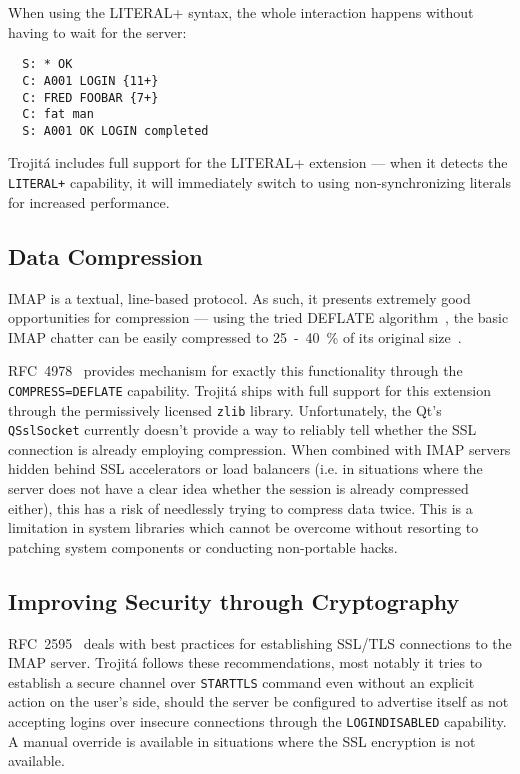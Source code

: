 \documentclass[trojita]{subfiles}
\begin{document}
When using the LITERAL+ syntax, the whole interaction happens without having to wait for the server:

\begin{verbatim}
  S: * OK
  C: A001 LOGIN {11+}
  C: FRED FOOBAR {7+}
  C: fat man
  S: A001 OK LOGIN completed
\end{verbatim}

Trojitá includes full support for the LITERAL+ extension --- when it detects the {\tt LITERAL+} capability, it will
immediately switch to using non-synchronizing literals for increased performance.

\subsection{Data Compression}

IMAP is a textual, line-based protocol.  As such, it presents extremely good opportunities for compression --- using the
tried DEFLATE algorithm~\cite{rfc1951}, the basic IMAP chatter can be easily compressed to 25~-~40~\% of its original
size~\cite[p. 4]{rfc4978}.

RFC~4978~\cite{rfc4978} provides mechanism for exactly this functionality through the {\tt COMPRESS=DEFLATE} capability.
Trojitá ships with full support for this extension through the permissively licensed {\tt zlib} library.  Unfortunately,
the Qt's {\tt QSslSocket} currently doesn't provide a way to reliably tell whether the SSL connection is already
employing compression.  When combined with IMAP servers hidden behind SSL accelerators or load balancers (i.e. in
situations where the server does not have a clear idea whether the session is already compressed either), this has a
risk of needlessly trying to compress data twice.  This is a limitation in system libraries which cannot be overcome
without resorting to patching system components or conducting non-portable hacks.

\subsection{Improving Security through Cryptography}

RFC~2595~\cite{rfc2595} deals with best practices for establishing SSL/TLS connections to the IMAP server.  Trojitá
follows these recommendations, most notably it tries to establish a secure channel over {\tt STARTTLS} command even
without an explicit action on the user's side, should the server be configured to advertise itself as not accepting
logins over insecure connections through the {\tt LOGINDISABLED} capability.  A manual override is available in
situations where the SSL encryption is not available.
\end{document}
